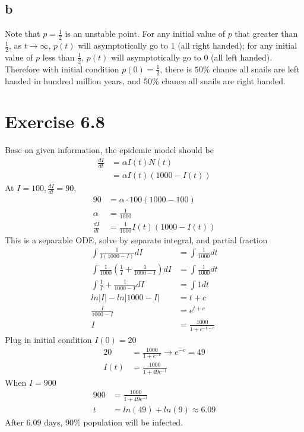 \documentclass[11pt,letterpaper]{article}
\begin{document}
\subsection*{b}
\noindent Note that $p = \frac{1}{2}$ is an unstable point. For any initial value of $p$ that greater than $\frac{1}{2}$, as $t \rightarrow \infty$, $p(t)$ will asymptotically go to 1 (all right handed); for any initial value of $p$ less than $\frac{1}{2}$, $p(t)$ will asymptotically go to 0 (all left handed). Therefore with initial condition $p(0) = \frac{1}{2}$, there is $50 \%$ chance all snails are left handed in hundred million years, and $50 \%$ chance all snails are right handed. 

\section*{Exercise 6.8}
\noindent Base on given information, the epidemic model should be 
\begin{align*}
\frac{d I}{dt} &= \alpha I(t) N(t) \\
&= \alpha I(t) (1000 - I(t))
\end{align*}
\noindent At $I = 100, \frac{dI}{dt} = 90$,
\begin{align*}
90 &= \alpha \cdot 100 (1000 - 100) \\
\alpha &= \frac{1}{1000} \\
\frac{dI }{dt} &= \frac{1}{1000} I(t) (1000 - I(t))
\end{align*}
\noindent This is a separable ODE, solve by separate integral, and partial fraction
\begin{align*}
\int \frac{1}{I (1000 - I)} dI &= \int \frac{1}{1000} dt \\
\int \frac{1}{1000} (\frac{1}{I} + \frac{1}{1000 - I}) dI &= \int \frac{1}{1000} dt \\
\int \frac{1}{I} + \frac{1}{1000 - I} dI &= \int 1 dt \\
ln|I| - ln|1000 - I| & = t + c \\
\frac{I}{1000 - I} &= e^{t + c} \\
I &= \frac{1000}{1 + e^{-t-c}}
\end{align*}
\noindent Plug in initial condition $I(0) = 20$ 
\begin{align*}
20 &= \frac{1000}{1 + e^{-c}} \rightarrow e^{-c} = 49 \\
I(t) &= \frac{1000}{1 + 49 e^{-t}}
\end{align*}
\noindent When $I = 900$ 
\begin{align*}
900 &= \frac{1000}{1 + 49 e^{-t}} \\
t &= ln(49) + ln(9) \approx 6.09
\end{align*}
\noindent After $6.09$ days, $90 \%$ population will be infected.
\end{document}
